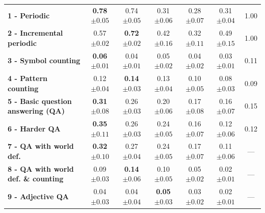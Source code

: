 \begin{table}[htbp]
\begin{tabular}{lcc|ccc|c}
\bfseries 1 - Periodic & \bfseries 0.78 ${\scriptscriptstyle \pm0.05 }$ &  0.74 ${\scriptscriptstyle \pm0.05 }$ &  0.31 ${\scriptscriptstyle \pm0.06 }$ &  0.28 ${\scriptscriptstyle \pm0.07 }$  &  0.31 ${\scriptscriptstyle \pm0.04 }$& 1.00 \\
\bfseries 2 - Incremental periodic &  0.57 ${\scriptscriptstyle \pm0.02 }$ & \bfseries 0.72 ${\scriptscriptstyle \pm0.02 }$ &  0.42 ${\scriptscriptstyle \pm0.16 }$ &  0.32 ${\scriptscriptstyle \pm0.11 }$  &  0.49 ${\scriptscriptstyle \pm0.15 }$& 1.00 \\
\bfseries 3 - Symbol counting & \bfseries 0.06 ${\scriptscriptstyle \pm0.01 }$ &  0.04 ${\scriptscriptstyle \pm0.01 }$ &  0.05 ${\scriptscriptstyle \pm0.02 }$ &  0.04 ${\scriptscriptstyle \pm0.02 }$  &  0.03 ${\scriptscriptstyle \pm0.01 }$& 0.11 \\
\bfseries 4 - Pattern counting &  0.12 ${\scriptscriptstyle \pm0.04 }$ & \bfseries 0.14 ${\scriptscriptstyle \pm0.03 }$ &  0.13 ${\scriptscriptstyle \pm0.04 }$ &  0.10 ${\scriptscriptstyle \pm0.05 }$  &  0.08 ${\scriptscriptstyle \pm0.03 }$& 0.09 \\
\bfseries 5 - Basic question answering (QA) & \bfseries 0.31 ${\scriptscriptstyle \pm0.08 }$ &  0.26 ${\scriptscriptstyle \pm0.03 }$ &  0.20 ${\scriptscriptstyle \pm0.06 }$ &  0.17 ${\scriptscriptstyle \pm0.08 }$  &  0.16 ${\scriptscriptstyle \pm0.07 }$& 0.15 \\
\bfseries 6 - Harder QA & \bfseries 0.35 ${\scriptscriptstyle \pm0.11 }$ &  0.26 ${\scriptscriptstyle \pm0.03 }$ &  0.24 ${\scriptscriptstyle \pm0.05 }$ &  0.16 ${\scriptscriptstyle \pm0.07 }$  &  0.12 ${\scriptscriptstyle \pm0.06 }$& 0.12 \\
\bfseries 7 - QA with world def. & \bfseries 0.32 ${\scriptscriptstyle \pm0.10 }$ &  0.27 ${\scriptscriptstyle \pm0.04 }$ &  0.24 ${\scriptscriptstyle \pm0.05 }$ &  0.17 ${\scriptscriptstyle \pm0.07 }$  &  0.11 ${\scriptscriptstyle \pm0.06 }$& --- \\
\bfseries 8 - QA with world def. \& counting &  0.09 ${\scriptscriptstyle \pm0.03 }$ & \bfseries 0.14 ${\scriptscriptstyle \pm0.06 }$ &  0.10 ${\scriptscriptstyle \pm0.05 }$ &  0.05 ${\scriptscriptstyle \pm0.02 }$  &  0.02 ${\scriptscriptstyle \pm0.01 }$& --- \\
\bfseries 9 - Adjective QA &  0.04 ${\scriptscriptstyle \pm0.03 }$ &  0.04 ${\scriptscriptstyle \pm0.04 }$ & \bfseries 0.05 ${\scriptscriptstyle \pm0.03 }$ &  0.03 ${\scriptscriptstyle \pm0.02 }$  &  0.02 ${\scriptscriptstyle \pm0.01 }$& --- \\

\end{tabular}
\end{table}
